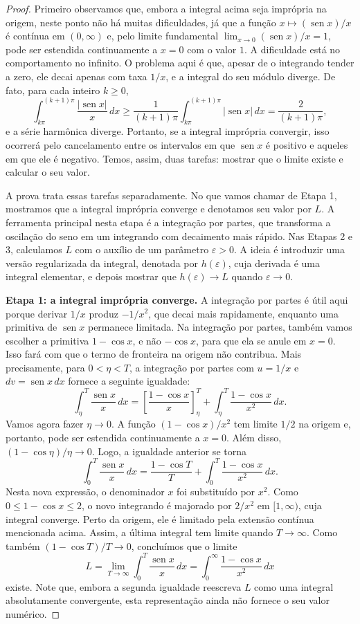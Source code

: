 \documentclass[12pt,portuguese]{article}
\theoremstyle{definition}
\theoremstyle{plainexercise}
\theoremstyle{starredexercise}
\theoremstyle{definition}
\renewcommand{\sin}{\operatorname{sen}}
\begin{document}
\begin{proof}
Primeiro observamos que, embora a integral acima seja imprópria na origem, neste
ponto não há muitas dificuldades, já que a função
$x\longmapsto(\sin x)/x$ é contínua em $(0,\infty)$ e, pelo limite fundamental
$\lim_{x\to0}(\sin x)/x=1$, pode ser estendida continuamente a $x=0$ com o
valor $1$. A dificuldade está no comportamento no infinito. O problema aqui é que, apesar de o
integrando tender a zero, ele decai apenas com taxa $1/x$, e a integral do seu
módulo diverge. De fato, para cada inteiro $k\geqslant0$,
\[
\int_{k\pi}^{(k+1)\pi}\frac{|\sin x|}{x}\,dx
\geqslant
\frac{1}{(k+1)\pi}\int_{k\pi}^{(k+1)\pi}|\sin x|\,dx
=
\frac{2}{(k+1)\pi},
\]
e a série harmônica diverge. Portanto, se a integral imprópria convergir,
isso ocorrerá pelo cancelamento entre os intervalos em que $\sin x$ é
positivo e aqueles em que ele é negativo. Temos, assim, duas tarefas:
mostrar que o limite existe e calcular o seu valor.

A prova trata essas tarefas separadamente. No que vamos chamar de Etapa 1, mostramos que a
integral imprópria converge e denotamos seu valor por $L$. A ferramenta principal nesta etapa é a
integração por partes, que transforma a oscilação do seno em um integrando
com decaimento mais rápido. Nas Etapas 2 e 3, calculamos $L$ com o auxílio de
um parâmetro $\varepsilon>0$. A ideia é introduzir uma versão regularizada da
integral, denotada por $h(\varepsilon)$, cuja derivada é uma integral
elementar, e depois mostrar que $h(\varepsilon)\to L$ quando
$\varepsilon\to0$.

\smallskip
\noindent\textbf{Etapa 1: a integral imprópria converge.}
A integração por partes é útil aqui porque derivar $1/x$ produz $-1/x^2$,
que decai mais rapidamente, enquanto uma primitiva de $\sin x$ permanece
limitada. Na integração por partes, também vamos escolher 
a primitiva $1-\cos x$, e não $-\cos x$, para que ela se
anule em $x=0$. Isso fará com que o termo de fronteira na origem não
contribua.
Mais precisamente, para $0<\eta<T$, a integração por partes com $u=1/x$ e $dv=\sin x\,dx$
fornece a seguinte igualdade:
\[
\int_\eta^T\frac{\sin x}{x}\,dx
=
\left[\frac{1-\cos x}{x}\right]_\eta^T
+
\int_\eta^T\frac{1-\cos x}{x^2}\,dx .
\]
Vamos agora fazer $\eta\to0$. A função $(1-\cos x)/x^2$ tem limite $1/2$ na
origem e, portanto, pode ser estendida continuamente a $x=0$. Além disso,
$(1-\cos\eta)/\eta\to0$. Logo, a igualdade anterior se torna
\[
\int_0^T\frac{\sin x}{x}\,dx
=
\frac{1-\cos T}{T}
+
\int_0^T\frac{1-\cos x}{x^2}\,dx .
\]
Nesta nova expressão, o denominador $x$ foi substituído por $x^2$. Como
$0\leqslant1-\cos x\leqslant2$, o novo integrando é majorado por $2/x^2$ em
$[1,\infty)$, cuja integral converge. Perto da origem, ele é limitado pela
extensão contínua mencionada acima. Assim, a última integral tem limite
quando $T\to\infty$. Como também $(1-\cos T)/T\to0$, concluímos que o limite
\[
L=\lim_{T\to\infty}\int_0^T\frac{\sin x}{x}\,dx
=\int_0^\infty\frac{1-\cos x}{x^2}\,dx
\]
existe. Note que, embora a segunda igualdade reescreva $L$ como uma integral absolutamente
convergente, esta representação ainda não fornece o seu valor numérico.


\end{proof}
\end{document}
